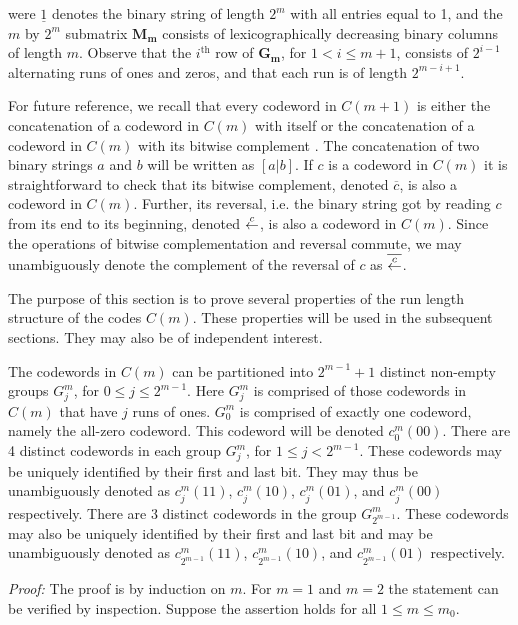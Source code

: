 \noindent were $\underline{1}$ denotes the binary string of length
$2^m$ with all entries equal to 1, and the $m$ by $2^m$ submatrix
$\mathbf{M_m}$ consists of lexicographically decreasing binary
columns of length $m$. Observe that the $i^{\text{th}}$ row of
$\mathbf{G_m}$, for $1 <i \leq m+1$, consists of $2^{i-1}$
alternating runs of ones and zeros, and that each run is of length
$2^{m-i+1}$.

 For future
reference, we recall that every codeword in $C(m+1)$ is either the
concatenation of a codeword in $C(m)$ with itself or the
concatenation of a codeword in $C(m)$ with its bitwise complement
\cite[Thm. 2, pg. 374]{mws:77}. The concatenation of two binary
strings $a$ and $b$ will be written as $[a | b]$. If $c$ is a
codeword in $C(m)$ it is straightforward to check that its bitwise
complement, denoted $\overline{c}$, is also a codeword in $C(m)$.
Further, its reversal, i.e. the binary string got by reading $c$
from its end to its beginning, denoted $\revc$, is also a codeword
in $C(m)$. Since the operations of bitwise complementation and
reversal commute, we may unambiguously denote the complement of
the reversal of $c$ as $\overline{\revc}$.

The purpose of this section is to prove
several properties of the run length
structure of the codes $C(m)$. These
properties will be used in the
subsequent sections. They may also be of independent
interest.

\begin{lemma}\label{Lem1}
The codewords in $C(m)$ can
be partitioned into $2^{m-1}+1$ distinct
non-empty groups $G_j^m$,
for $0 \leq j \leq 2^{m-1}$.
Here $G_j^m$ is comprised of
those codewords in $C(m)$ that have
$j$ runs of ones.
$G_0^m$ is comprised of
exactly one codeword, namely the all-zero codeword. This codeword will be denoted
$c_0^m(00)$.
There are 4 distinct codewords in each
group $G_j^m$, for $1 \le j  < 2^{m-1}$.
These codewords may be uniquely identified
by their first and last bit. They may
thus be unambiguously denoted as
$c_j^m(11)$, $c_j^m(10)$, $c_j^m(01)$,
and  $c_j^m(00)$ respectively.
There are 3 distinct
codewords in the group $G_{2^{m-1}}^m$.
These codewords may also be uniquely identified
by their first and last bit and may
be unambiguously denoted as
$c_{2^{m-1}}^m(11)$,
$c_{2^{m-1}}^m(10)$,
and  $c_{2^{m-1}}^m(01)$ respectively.
\end{lemma}

\noindent \textit{Proof:} The proof is by induction on $m$. For
$m=1$ and $m=2$ the statement can be verified by inspection.
Suppose the assertion holds for all $1 \le m \le m_0$.

